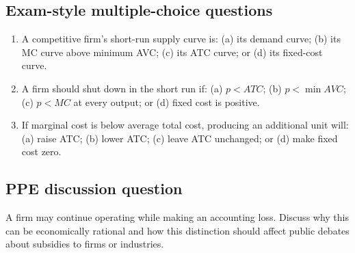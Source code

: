 \subsection*{Exam-style multiple-choice questions}
\begin{enumerate}[resume,label=\arabic*.]
  \item A competitive firm's short-run supply curve is: (a) its demand curve;
  (b) its MC curve above minimum AVC; (c) its ATC curve; or (d) its fixed-cost curve.
  \item A firm should shut down in the short run if: (a) $p<ATC$;
  (b) $p<\min AVC$; (c) $p<MC$ at every output; or (d) fixed cost is positive.
  \item If marginal cost is below average total cost, producing an additional
  unit will: (a) raise ATC; (b) lower ATC; (c) leave ATC unchanged; or
  (d) make fixed cost zero.
\end{enumerate}

\subsection*{PPE discussion question}

\noindent A firm may continue operating while making an accounting loss.
Discuss why this can be economically rational and how this distinction should
affect public debates about subsidies to firms or industries.
